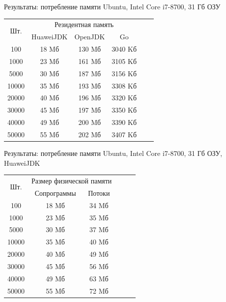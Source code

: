 \begin{frame}{Результаты: потребление памяти}
	Ubuntu, Intel Core i7-8700, 31 Гб ОЗУ
	\begin{table}[H]
		\begin{tabular}{|c|c|c|c|c|c|}
			\hline \multirow{2}{*}{Шт.} & \multicolumn{3}{|c|}{Резидентная память}  \\
			\cline{2-4}    & HuaweiJDK   & OpenJDK    & Go       \\
			\hline 100     & 18 Mб       & 130 Mб     & 3040 Kб  \\
			\hline 1000    & 23 Mб       & 161 Mб     & 3105 Kб  \\
			\hline 5000    & 30 Mб       & 187 Mб     & 3156 Kб  \\
			\hline 10000   & 35 Mб       & 193 Mб     & 3308 Kб  \\
			\hline 20000   & 40 Mб       & 196 Mб     & 3320 Kб  \\
			\hline 30000   & 45 Mб       & 197 Mб     & 3350 Kб  \\
			\hline 40000   & 49 Mб       & 200 Mб     & 3390 Kб  \\
			\hline 50000   & 55 Mб       & 202 Mб     & 3407 Kб  \\ 
			\hline 
		\end{tabular}
	\end{table}
\end{frame}

\begin{frame}{Результаты: потребление памяти}
	Ubuntu, Intel Core i7-8700, 31 Гб ОЗУ, HuaweiJDK
	\begin{table}[H]
		\begin{tabular}{|c|c|c|c|c|c|}
			\hline \multirow{2}{*}{Шт.} & \multicolumn{2}{|c|}{Размер физической памяти}  \\
			\cline{2-3}    & Сопрограммы   & Потоки    \\
			\hline 100     & 18 Mб         & 34 Mб     \\
			\hline 1000    & 23 Mб         & 35 Mб     \\
			\hline 5000    & 30 Mб         & 37 Mб     \\
			\hline 10000   & 35 Mб         & 40 Mб     \\
			\hline 20000   & 40 Mб         & 49 Mб     \\
			\hline 30000   & 45 Mб         & 56 Mб     \\
			\hline 40000   & 49 Mб         & 63 Mб     \\
			\hline 50000   & 55 Mб         & 72 Mб     \\ 
			\hline 
		\end{tabular}
	\end{table}
\end{frame}

